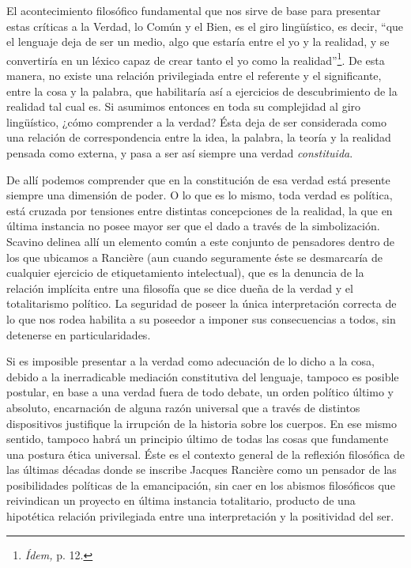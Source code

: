 El acontecimiento filosófico fundamental que nos sirve de base para presentar estas críticas a la Verdad, lo Común y el Bien, es el giro lingüístico, es decir, \enquote{que el lenguaje deja de ser un medio, algo que estaría entre el yo y la realidad, y se convertiría en un léxico capaz de crear tanto el yo como la realidad}\footnote{\emph{Ídem,} p. 12.}. De esta manera, no existe una relación privilegiada entre el referente y el significante, entre la cosa y la palabra, que habilitaría así a ejercicios de descubrimiento de la realidad tal cual es. Si asumimos entonces en toda su complejidad al giro lingüístico, ¿cómo comprender a la verdad? Ésta deja de ser considerada como una relación de correspondencia entre la idea, la palabra, la teoría y la realidad pensada como externa, y pasa a ser así siempre una verdad \emph{constituida}.

De allí podemos comprender que en la constitución de esa verdad está presente siempre una dimensión de poder. O lo que es lo mismo, toda verdad es política, está cruzada por tensiones entre distintas concepciones de la realidad, la que en última instancia no posee mayor ser que el dado a través de la simbolización. Scavino delinea allí un elemento común a este conjunto de pensadores dentro de los que ubicamos a Rancière (aun cuando seguramente éste se desmarcaría de cualquier ejercicio de etiquetamiento intelectual), que es la denuncia de la relación implícita entre una filosofía que se dice dueña de la verdad y el totalitarismo político. La seguridad de poseer la única interpretación correcta de lo que nos rodea habilita a su poseedor a imponer sus consecuencias a todos, sin detenerse en particularidades.

Si es imposible presentar a la verdad como adecuación de lo dicho a la cosa, debido a la inerradicable mediación constitutiva del lenguaje, tampoco es posible postular, en base a una verdad fuera de todo debate, un orden político último y absoluto, encarnación de alguna razón universal que a través de distintos dispositivos justifique la irrupción de la historia sobre los cuerpos. En ese mismo sentido, tampoco habrá un principio último de todas las cosas que fundamente una postura ética universal. Éste es el contexto general de la reflexión filosófica de las últimas décadas donde se inscribe Jacques Rancière como un pensador de las posibilidades políticas de la emancipación, sin caer en los abismos filosóficos que reivindican un proyecto en última instancia totalitario, producto de una hipotética relación privilegiada entre una interpretación y la positividad del ser.

